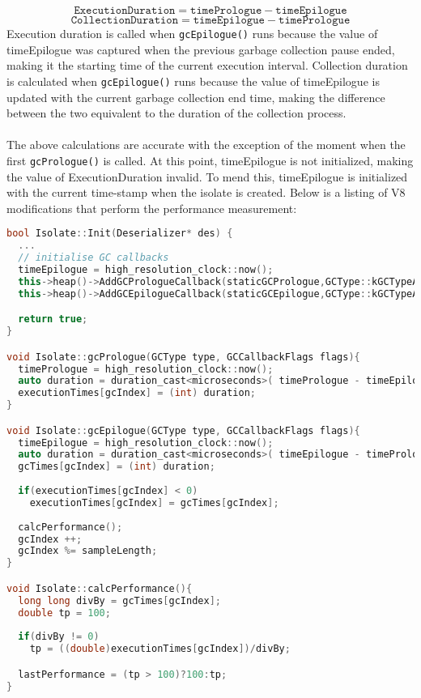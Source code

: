 \documentclass{l4proj}
\begin{document}
\begin{equation}
\texttt{ExecutionDuration} = \texttt{timePrologue} - \texttt{timeEpilogue}
\end{equation}
\begin{equation}
\texttt{CollectionDuration} = \texttt{timeEpilogue} - \texttt{timePrologue}
\end{equation}
Execution duration is called when \texttt{gcEpilogue()} runs because the value of timeEpilogue was captured when the previous garbage collection pause ended, making it the starting time of the current execution interval. Collection duration is calculated when \texttt{gcEpilogue()} runs because the value of timeEpilogue is updated with the current garbage collection end time, making the difference between the two equivalent to the duration of the collection process. 
\\\\
\hspace*{3em} The above calculations are accurate with the exception of the moment when the first \texttt{gcPrologue()} is called. At this point, timeEpilogue is not initialized, making the value of ExecutionDuration invalid. To mend this, timeEpilogue is initialized with the current time-stamp when the isolate is created. Below is a listing of V8 modifications that perform the performance measurement:
\begin{lstlisting}[language=cpp]
bool Isolate::Init(Deserializer* des) {
  ...
  // initialise GC callbacks
  timeEpilogue = high_resolution_clock::now();
  this->heap()->AddGCPrologueCallback(staticGCPrologue,GCType::kGCTypeAll,true);
  this->heap()->AddGCEpilogueCallback(staticGCEpilogue,GCType::kGCTypeAll,true);

  return true;
}

void Isolate::gcPrologue(GCType type, GCCallbackFlags flags){
  timePrologue = high_resolution_clock::now();
  auto duration = duration_cast<microseconds>( timePrologue - timeEpilogue ).count();
  executionTimes[gcIndex] = (int) duration;
}

void Isolate::gcEpilogue(GCType type, GCCallbackFlags flags){
  timeEpilogue = high_resolution_clock::now();
  auto duration = duration_cast<microseconds>( timeEpilogue - timePrologue ).count();
  gcTimes[gcIndex] = (int) duration;
  
  if(executionTimes[gcIndex] < 0)
    executionTimes[gcIndex] = gcTimes[gcIndex];
  
  calcPerformance();  
  gcIndex ++;
  gcIndex %= sampleLength;
}

void Isolate::calcPerformance(){
  long long divBy = gcTimes[gcIndex];
  double tp = 100;
  
  if(divBy != 0)
    tp = ((double)executionTimes[gcIndex])/divBy;

  lastPerformance = (tp > 100)?100:tp;
}
\end{lstlisting}
\end{document}
